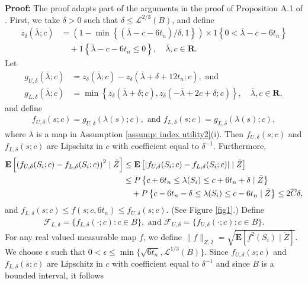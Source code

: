 \documentclass[12pt, fullpage]{amsart}
\theoremstyle{definition}
\theoremstyle{definition}
\theoremstyle{definition}
\begin{document}
\begin{bibunit}[econometrica]
\noindent \textbf{Proof: } The proof adapts part of the arguments in the proof of Proposition A.1 of \cite{Guerre/Sabbah:2012:ET}. First, we take $\delta>0$ such that $\delta \le \mathcal{L}^{2/3}(B)$, and define
\begin{align*}
	z_\delta(\overline \lambda;c) &= \left( 1 - \min\left\{ (\overline \lambda - c -6 t_n)/\delta, 1\right\}\right) \times 1\left\{0 < \overline \lambda - c - 6 t_n\right\} \\
	&\quad + 1\left\{\overline \lambda - c - 6 t_n \le 0 \right\}, \quad \overline \lambda, c \in \mathbf{R}.
\end{align*}
Let
\begin{align*}
	g_{U,\delta}(\overline \lambda;c) &= z_{\delta}(\overline \lambda;c) - z_{\delta}(\overline \lambda + \delta + 12 t_n; c), \text{ and }\\
	g_{L,\delta}(\overline \lambda;c) &= \min\left\{z_\delta(\overline \lambda + \delta; c), z_\delta(-\overline \lambda + 2c + \delta; c) \right\}, \quad \overline \lambda, c \in \mathbf{R},
\end{align*}
and define
\begin{align*}
	f_{U,\delta}(s;c) = g_{U,\delta}(\lambda(s);c), \text{ and } f_{L,\delta}(s;c) = g_{L,\delta}(\lambda(s);c),
\end{align*}
where $\lambda$ is a map in Assumption \ref{assump: index utility2}(i). Then $f_{U,\delta}(s;c)$ and $f_{L,\delta}(s;c)$ are Lipschitz in $c$ with coefficient equal to $\delta^{-1}$. Furthermore,
\begin{align}
	\label{ineq5}
	\mathbf{E}\left[ \left( f_{U,\delta}(S_i;c) - f_{L,\delta}(S_i;c) \right)^2 \mid \tilde Z \right] &\le \mathbf{E}\left[ \left| f_{U,\delta}(S_i;c) - f_{L,\delta}(S_i;c) \right| \mid \tilde Z \right] \\ \notag
	&\le P\left\{ c + 6 t_n \le \lambda(S_i) \le c + 6 t_n + \delta \mid \tilde Z \right\}\\ \notag
	&\quad + P\left\{ c - 6 t_n - \delta \le \lambda(S_i) \le c - 6 t_n \mid \tilde Z \right\} \le 2 \overline C \delta, 
\end{align} 
and $f_{L,\delta}(s;c) \le f(s;c,6 t_n) \le f_{U,\delta}(s;c)$. (See Figure \ref{fig1}.) Define
\begin{align*}
	\mathcal{F}_{L,\delta} = \{f_{L,\delta}(\cdot; c): c \in B\}, \text{ and } \mathcal{F}_{U,\delta} = \{f_{U,\delta}(\cdot; c): c \in B\}.
\end{align*}
For any real valued measurable map $f$, we define $\| f \|_{Z,2} = \sqrt{\mathbf{E}[f^2(S_i) \mid \tilde Z]}$. We choose $\epsilon$ such that $0 < \epsilon \le \min\{\sqrt{6 t_n},\mathcal{L}^{1/3}(B)\}$. Since $f_{U,\delta}(s;c)$ and $f_{L,\delta}(s;c)$ are Lipschitz in $c$ with coefficient equal to $\delta^{-1}$ and since $B$ is a bounded interval, it follows

\end{bibunit}
\end{document}
